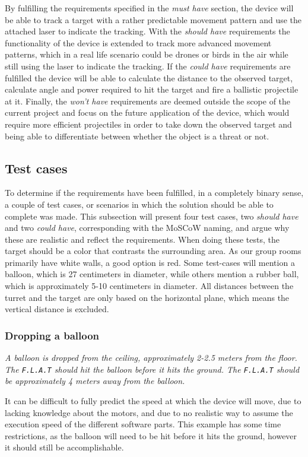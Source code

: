 By fulfilling the requirements specified in the \textit{must have} section, the device will be able to track a target with a rather predictable movement pattern and use the attached laser to indicate the tracking.
With the \textit{should have} requirements the functionality of the device is extended to track more advanced movement patterns, which in a real life scenario could be drones or birds in the air while still using the laser to indicate the tracking.
If the \textit{could have} requirements are fulfilled the device will be able to calculate the distance to the observed target, calculate angle and power required to hit the target and fire a ballistic projectile at it.
Finally, the \textit{won't have} requirements are deemed outside the scope of the current project and focus on the future application of the device, which would require more efficient projectiles in order to take down the observed target and being able to differentiate between whether the object is a threat or not.

\subsection{Test cases}
To determine if the requirements have been fulfilled, in a completely binary sense, a couple of test cases, or scenarios in which the solution should be able to complete was made.
This subsection will present four test cases, two \textit{should have} and two \textit{could have}, corresponding with the MoSCoW naming, and argue why these are realistic and reflect the requirements.
When doing these tests, the target should be a color that contrasts the surrounding area.
As our group rooms primarily have white walls, a good option is red.
Some test-cases will mention a balloon, which is 27 centimeters in diameter, while others mention a rubber ball, which is approximately 5-10 centimeters in diameter.
All distances between the turret and the target are only based on the horizontal plane, which means the vertical distance is excluded.

\subsubsection{Dropping a balloon}
\textit{A balloon is dropped from the ceiling, approximately 2-2.5 meters from the floor.
The \texttt{F.L.A.T} should hit the balloon before it hits the ground.
The \texttt{F.L.A.T} should be approximately 4 meters away from the balloon.}

It can be difficult to fully predict the speed at which the device will move, due to lacking knowledge about the motors, and due to no realistic way to assume the execution speed of the different software parts.
This example has some time restrictions, as the balloon will need to be hit before it hits the ground, however it should still be accomplishable.

